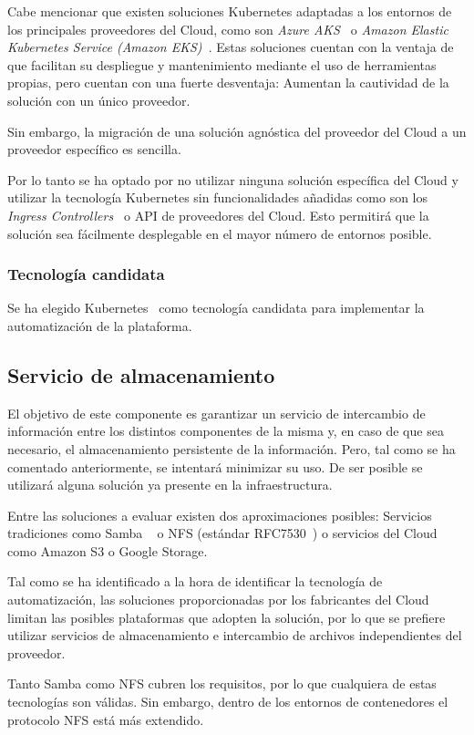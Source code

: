 \par Cabe mencionar que existen soluciones Kubernetes adaptadas a los entornos de los principales proveedores del Cloud, como son {\em Azure AKS~\cite{aks}} o
{\em Amazon Elastic Kubernetes Service (Amazon EKS)~\cite{eks}}. Estas soluciones cuentan con la ventaja de que facilitan su despliegue y mantenimiento mediante
el uso de herramientas propias, pero cuentan con una fuerte desventaja: Aumentan la cautividad de la solución con un único proveedor.
\par Sin embargo, la migración de una solución agnóstica del proveedor del Cloud a un proveedor específico es sencilla.
\par Por lo tanto se ha optado por no utilizar ninguna solución específica del Cloud y utilizar la tecnología Kubernetes sin funcionalidades añadidas como son
los {\em Ingress Controllers~\cite{ingresscontrollers}} o API de proveedores del Cloud. Esto permitirá que la solución sea fácilmente desplegable en el mayor
número de entornos posible.

\subsubsection{Tecnología candidata}
\par Se ha elegido Kubernetes~\cite{kubernetes} como tecnología candidata para implementar la automatización de la plataforma.

\subsection{Servicio de almacenamiento}
\par El objetivo de este componente es garantizar un servicio de intercambio de información entre los distintos componentes de la misma y, en caso de que sea
necesario, el almacenamiento persistente de la información. Pero, tal como se ha comentado anteriormente, se intentará minimizar su uso. De ser posible se
utilizará alguna solución ya presente en la infraestructura.
\par Entre las soluciones a evaluar existen dos aproximaciones posibles: Servicios tradiciones como Samba ~\cite{samba} o  NFS (estándar RFC7530~\cite{nfs}) o
servicios del Cloud como Amazon S3\cite{s3} o Google Storage\cite{GoogleStorage}.

\par Tal como se ha identificado a la hora de identificar la tecnología de automatización, las soluciones proporcionadas por los fabricantes del Cloud limitan
las posibles plataformas que adopten la solución, por lo que se prefiere utilizar servicios de almacenamiento e intercambio de archivos independientes del
proveedor.
\par Tanto Samba como NFS cubren los requisitos, por lo que cualquiera de estas tecnologías son válidas. Sin embargo, dentro de los entornos de contenedores el
protocolo NFS está más extendido.

